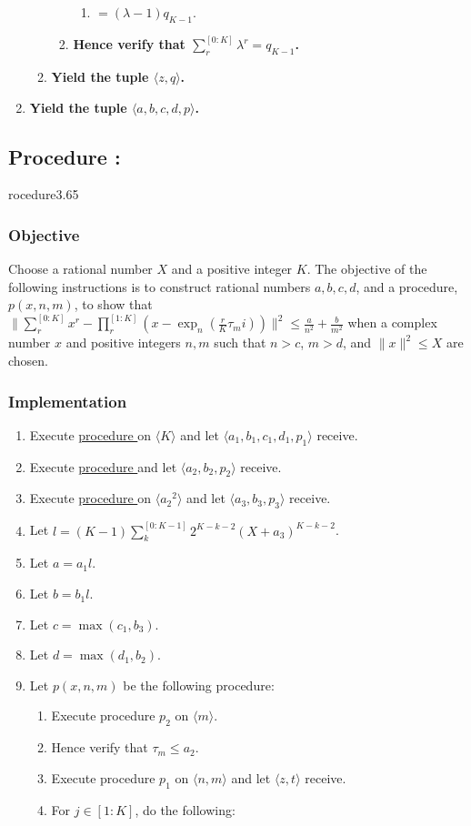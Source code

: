 \documentclass{article}
\newcounter{procedure}[part]
\newcommand{\procedure}[1]{\subsection*{Procedure \thepart:\theprocedure}\label{sec:procedure #1}\global\expandafter\edef\csname procedure#1\endcsname{\thepart:\theprocedure}\addtocounter{procedure}{1}}
\newcommand{\objective}{\subsubsection*{Objective}}
\newcommand{\implementation}{\subsubsection*{Implementation}}
\newcommand{\procedurehr}[1]{\hyperref[sec:procedure #1]{procedure \expandafter\csname procedure#1\endcsname}}
\begin{document}
\begin{multicols}{2}
\begin{enumerate}
\begin{enumerate}
\begin{enumerate}
\begin{enumerate}
								\item $=(\lambda-1)q_{K-1}$.
							\end{enumerate}
							\item \textbf{Hence verify that $\sum_r^{[0:K]}\lambda^r=q_{K-1}$.}
						\end{enumerate}
						\item \textbf{Yield the tuple $\langle z,q\rangle$.}
					\end{enumerate}
					\item \textbf{Yield the tuple $\langle a,b,c,d,p\rangle$.}
				\end{enumerate}
		\procedure{3.65}
			\objective
				Choose a rational number $X$ and a positive integer $K$. The objective of the following instructions is to construct rational numbers $a,b,c,d$, and a procedure, $p(x,n,m)$, to show that $\lVert \sum_r^{[0:K]}x^r-\prod_r^{[1:K]}(x-\exp_n(\frac{r}{K}\tau_mi))\rVert^2\le\frac{a}{n^2}+\frac{b}{m^2}$ when a complex number $x$ and positive integers $n,m$ such that $n>c$, $m>d$, and $\lVert x\rVert^2\le X$ are chosen.
			\implementation
				\begin{enumerate}
					\item Execute \procedurehr{3.64} on $\langle K\rangle$ and let $\langle a_1,b_1,c_1,d_1,p_1\rangle$ receive.
					\item Execute \procedurehr{3.50} and let $\langle a_2,b_2,p_2\rangle$ receive.
					\item Execute \procedurehr{3.13} on $\langle {a_2}^2\rangle$ and let $\langle a_3,b_3,p_3\rangle$ receive.
					\item Let $l=(K-1)\sum_k^{[0:K-1]}2^{K-k-2}(X+a_3)^{K-k-2}$.
					\item Let $a=a_1l$.
					\item Let $b=b_1l$.
					\item Let $c=\max(c_1,b_3)$.
					\item Let $d=\max(d_1,b_2)$.
					\item Let $p(x,n,m)$ be the following procedure:
					\begin{enumerate}
						\item Execute procedure $p_2$ on $\langle m\rangle$.
						\item Hence verify that $\tau_m\le a_2$.
						\item Execute procedure $p_1$ on $\langle n,m\rangle$ and let $\langle z,t\rangle$ receive.
						\item For $j\in[1:K]$, do the following:
						\begin{enumerate}

\end{enumerate}
\end{enumerate}
\end{enumerate}
\end{multicols}
\end{document}

